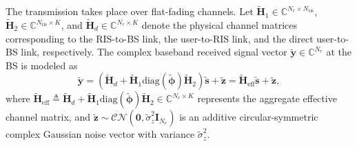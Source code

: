 \documentclass[conference]{IEEEtran}
\begin{document}
The transmission takes place over flat-fading channels. Let $\tilde{\mathbf{H}}_1 \in \mathbb{C}^{N_r \times N_{\mathrm{ris}}}$, $\tilde{\mathbf{H}}_2 \in \mathbb{C}^{N_{\mathrm{ris}} \times K}$, and $\tilde{\mathbf{H}}_d \in \mathbb{C}^{N_r \times K}$ denote the physical channel matrices corresponding to the RIS-to-BS link, the user-to-RIS link, and the direct user-to-BS link, respectively. The complex baseband received signal vector $\tilde{\mathbf{y}} \in \mathbb{C}^{N_r}$ at the BS is modeled as
\begin{equation}
	\tilde{\mathbf{y}} = \left(\tilde{\mathbf{H}}_d + \tilde{\mathbf{H}}_1 \mathrm{diag}(\tilde{\boldsymbol{\phi}}) \tilde{\mathbf{H}}_2\right)\tilde{\mathbf{s}} + \tilde{\mathbf{z}} = \tilde{\mathbf{H}}_{\mathrm{eff}} \tilde{\mathbf{s}} + \tilde{\mathbf{z}}, \label{eq1}
\end{equation}
where $\tilde{\mathbf{H}}_{\mathrm{eff}} \triangleq \tilde{\mathbf{H}}_d + \tilde{\mathbf{H}}_1 \mathrm{diag}(\tilde{\boldsymbol{\phi}}) \tilde{\mathbf{H}}_2 \in \mathbb{C}^{N_r \times K}$ represents the aggregate effective channel matrix, and $\tilde{\mathbf{z}} \sim \mathcal{CN}(\mathbf{0}, \tilde{\sigma}_z^2 \mathbf{I}_{N_r})$ is an additive circular-symmetric complex Gaussian noise vector with variance $\tilde{\sigma}_z^2$. 
\end{document}
